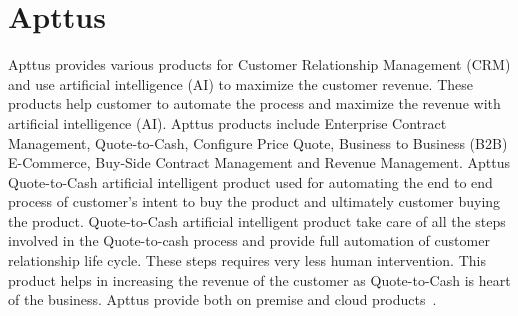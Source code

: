 \section{Apttus}

Apttus provides various products for Customer Relationship Management
(CRM) and use artificial intelligence (AI) to
maximize the customer revenue. These products help customer to
automate the process and maximize the revenue with artificial
intelligence (AI). Apttus products include Enterprise
Contract Management, Quote-to-Cash, Configure
Price Quote, Business to Business (B2B) E-Commerce, Buy-Side Contract
Management and Revenue Management. Apttus
Quote-to-Cash artificial intelligent product used
for automating the end to end process of customer's intent to buy the
product and ultimately customer buying the
product. Quote-to-Cash artificial intelligent
product take care of all the steps involved in the
Quote-to-cash process and provide full automation
of customer relationship life cycle. These steps requires very less
human intervention. This product helps in increasing the revenue of
the customer as Quote-to-Cash is heart of the
business. Apttus provide both on premise and cloud
products~\cite{hid-sp18-511-apttus}.
 
